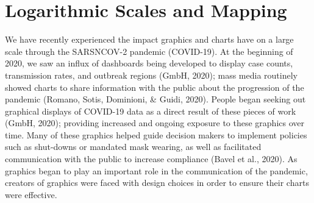 \documentclass[print]{nuthesis}
\begin{document}
\hypertarget{logarithmic-scales-and-mapping}{%
\section{Logarithmic Scales and Mapping}\label{logarithmic-scales-and-mapping}}

We have recently experienced the impact graphics and charts have on a large scale through the SARSNCOV-2 pandemic (COVID-19). At the beginning of 2020, we saw an influx of dashboards being developed to display case counts, transmission rates, and outbreak regions (GmbH, 2020); mass media routinely showed charts to share information with the public about the progression of the pandemic (Romano, Sotis, Dominioni, \& Guidi, 2020).
People began seeking out graphical displays of COVID-19 data as a direct result of these pieces of work (GmbH, 2020); providing increased and ongoing exposure to these graphics over time.
Many of these graphics helped guide decision makers to implement policies such as shut-downs or mandated mask wearing, as well as facilitated communication with the public to increase compliance (Bavel et al., 2020).
As graphics began to play an important role in the communication of the pandemic, creators of graphics were faced with design choices in order to ensure their charts were effective.
\end{document}
